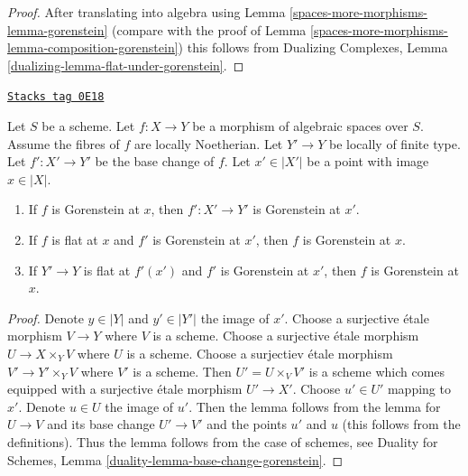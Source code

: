 \begin{proof}
After translating into algebra using Lemma \ref{spaces-more-morphisms-lemma-gorenstein}
(compare with the proof of
Lemma \ref{spaces-more-morphisms-lemma-composition-gorenstein}) this follows from
Dualizing Complexes, Lemma \ref{dualizing-lemma-flat-under-gorenstein}.
\end{proof}

\begin{lemma}
\label{spaces-more-morphisms-lemma-base-change-gorenstein}
\href{https://stacks.math.columbia.edu/tag/0E18}{\texttt{Stacks tag 0E18}}

Let $S$ be a scheme.
Let $f : X \to Y$ be a morphism of algebraic spaces over $S$.
Assume the fibres of $f$ are locally Noetherian.
Let $Y' \to Y$ be locally of finite type. Let $f' : X' \to Y'$
be the base change of $f$.
Let $x' \in |X'|$ be a point with image $x \in |X|$.
\begin{enumerate}
\item If $f$ is Gorenstein at $x$, then
$f' : X' \to Y'$ is Gorenstein at $x'$.
\item If $f$ is flat at $x$ and $f'$ is Gorenstein at $x'$, then $f$
is Gorenstein at $x$.
\item If $Y' \to Y$ is flat at $f'(x')$ and $f'$ is Gorenstein at
$x'$, then $f$ is Gorenstein at $x$.
\end{enumerate}
\end{lemma}

\begin{proof}
Denote $y \in |Y|$ and $y' \in |Y'|$ the image of $x'$.
Choose a surjective \'etale morphism $V \to Y$ where $V$ is a scheme.
Choose a surjective \'etale morphism $U \to X \times_Y V$ where
$U$ is a scheme.
Choose a surjectiev \'etale morphism $V' \to Y' \times_Y V$
where $V'$ is a scheme.
Then $U' = U \times_V V'$ is a scheme which comes equipped
with a surjective \'etale morphism $U' \to X'$.
Choose $u' \in U'$ mapping to $x'$. Denote $u \in U$ the image of $u'$.
Then the lemma follows from the lemma for
$U \to V$ and its base change $U' \to V'$ and the
points $u'$ and $u$ (this follows from the definitions).
Thus the lemma follows from the case of schemes, see
Duality for Schemes, Lemma \ref{duality-lemma-base-change-gorenstein}.
\end{proof}

